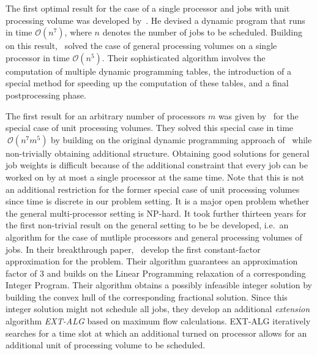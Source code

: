 \documentclass[a4paper]{article}
\begin{document}
The first optimal result for the case of a single processor and jobs with unit processing volume was developed by~\cite{baptiste_unit_jobs}.
He devised a dynamic program that runs in time $\mathcal{O}(n^7)$, where $n$ denotes the number of jobs to be scheduled.
Building on this result,~\cite{baptiste_general_jobs} solved the case of general processing volumes on a single processor in time $\mathcal{O}(n^5)$.
Their sophisticated algorithm involves the computation of multiple dynamic programming tables, the introduction of a special method for speeding up the computation of these tables, and a final postprocessing phase.

The first result for an arbitrary number of processors $m$ was given by~\cite{demaine} for the special case of unit processing volumes.
They solved this special case in time $~\mathcal{O}(n^7m^5)$ by building on the original dynamic programming approach of~\cite{baptiste_unit_jobs} while non-trivially obtaining additional structure.
Obtaining good solutions for general job weights is difficult because of the additional constraint that every job can be worked on by at most a single processor at the same time.
Note that this is not an additional restriction for the former special case of unit processing volumes since time is discrete in our problem setting.
It is a major open problem whether the general multi-processor setting is NP-hard.
It took further thirteen years for the first non-trivial result on the general setting to be be developed, i.e.\ an algorithm for the case of mutliple processors and general processing volumes of jobs.
In their breakthrough paper,~\cite{antoniadis} develop the first constant-factor approximation for the problem.
Their algorithm guarantees an approximation factor of $3$ and builds on the Linear Programming relaxation of a corresponding Integer Program.
Their algorithm obtains a possibly infeasible integer solution by building the convex hull of the corresponding fractional solution.
Since this integer solution might not schedule all jobs, they develop an additional \textit{extension} algorithm \textit{EXT-ALG} based on maximum flow calculations.
EXT-ALG iteratively searches for a time slot at which an additional turned on processor allows for an additional unit of processing volume to be scheduled.
\end{document}
